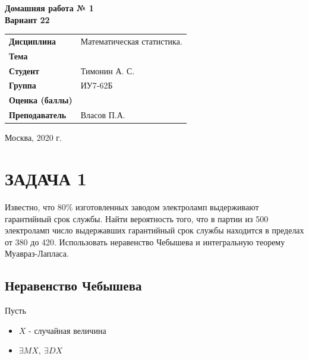 \documentclass[12pt, a4paper]{report}
\begin{document}
\begin{titlepage}
  	\vspace{2cm}
  	
  	\begin{center}
  		\textbf{Домашняя работа № 1} \\
  		\vspace{0.5cm}
  		\textbf{Вариант 22}
  	\end{center}
  	
  	\vspace{4cm}
  	
  	\begin{flushleft}
  		\begin{tabular}{ll}
  			\textbf{Дисциплина} & Математическая статистика. \\
  			\textbf{Тема} & \\
  			\textbf{Студент} & Тимонин А. С. \\
  			\textbf{Группа} & ИУ7-62Б \\
  			\textbf{Оценка (баллы)} & \\
  			\textbf{Преподаватель} & Власов П.А. \\
  		\end{tabular}
  	\end{flushleft}
  	
  	\vspace{6cm}
  	
  	\begin{center}
  		Москва, 2020 г.
  	\end{center}
  	
  	
  \end{titlepage}
  
	
	\section{ЗАДАЧА 1}
	
	\hspace{1cm} Известно, что 80\% изготовленных заводом электроламп выдерживают гарантийный срок службы. Найти вероятность того, что в партии из 500 электроламп число выдержавших гарантийный срок службы находится в пределах от 380 до 420. Использовать неравенство Чебышева и интегральную теорему Муавраз-Лапласа.
	
	\subsection{Неравенство Чебышева}
	
	Пусть
	
	\begin{itemize}
		\item $X$ - случайная величина
		\item $\exists MX,\ \exists DX$
	\end{itemize}
\end{document}
